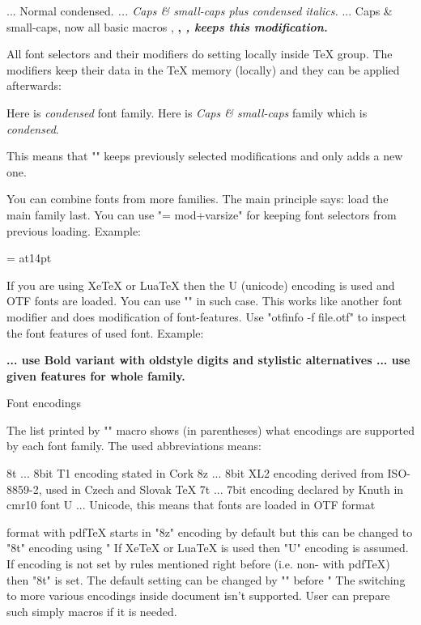 \begtt

{\cond\rm       ... Normal condensed.}
{\caps\cond\it  ... Caps \& small-caps plus condensed italics.}
{\caps\fam      ... Caps \& small-caps, now all basic macros
                    \rm, \bf, \it, \bi keeps this modification.}
\endtt

All font selectors and their modifiers do setting locally inside TeX group.
The modifiers keep their data in the \TeX{} memory (locally) and they can be
applied afterwards: 

\begtt
{\cond\fam \rm Here is {\it condensed} font family. 
 \caps\fam \rm Here is {\it Caps \& small-caps} family which is {\it condensed}.}
\endtt

This means that "\modifier\something" keeps previously selected
modifications and only adds a new one.

You can combine fonts from more families. The main principle says: 
load the main family last. You can
use "\ffletfont\newselector = {mod+var}{size}" for keeping font selectors from
previous loading. Example:

\begtt
 
\ffletfont \titlefont = {\cond\bf}{at14pt} %
\endtt

If you are using XeTeX or LuaTeX then the U (unicode) encoding is used and
OTF fonts are loaded. You can use "" in such case. This works like
another font modifier and does modification of font-features. Use 
"otfinfo -f file.otf" to inspect the font features of used font. Example:

\begtt
{}\bf  ... use Bold variant with oldstyle digits and
                            stylistic alternatives
\fam ... use given features for whole family.
\endtt

\secc Font encodings

The list printed by "\fontfam" macro shows (in parentheses) what encodings
are supported by each font family. The used abbreviations means:

\begtt
8t ... 8bit T1 encoding stated in Cork
8z ... 8bit XL2 encoding derived from ISO-8859-2, used in Czech and Slovak TeX
7t ... 7bit encoding declared by Knuth in cmr10 font
U  ... Unicode, this means that fonts are loaded in OTF format
\endtt

\csplain{} format with pdf\TeX{} starts in "8z" encoding by default but this can be
changed to "8t" encoding using " If Xe\TeX{} or LuaTeX is
used then "U" encoding is assumed. If encoding is not set by rules mentioned
right before (i.e. non-\csplain{} with pdf\TeX) then "8t" is set. The
default setting can be changed by "\def\fotenc{enc}" before 
" The switching to more various encodings inside document
isn't supported. User can prepare such simply macros if it is needed.

